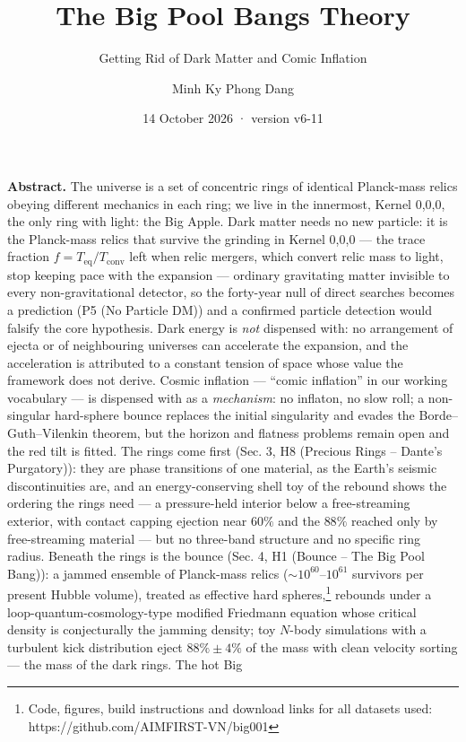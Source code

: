 \documentclass[
  11pt,
]{article}
\title{The Big Pool Bangs Theory}
\subtitle{Getting Rid of Dark Matter and Comic Inflation}
\author{Minh Ky Phong Dang}
\date{14 October 2026 · version v6-11}
\begin{document}
\maketitle

\textbf{Abstract.} The universe is a set of concentric rings of
identical Planck-mass relics obeying different mechanics in each ring;
we live in the innermost, Kernel 0,0,0, the only ring with light: the
Big Apple. Dark matter needs no new particle: it is the Planck-mass
relics that survive the grinding in Kernel 0,0,0 --- the trace fraction
\(f = T_{\text{eq}}/T_{\text{conv}}\) left when relic mergers, which
convert relic mass to light, stop keeping pace with the expansion ---
ordinary gravitating matter invisible to every non-gravitational
detector, so the forty-year null of direct searches becomes a prediction
(P5 (No Particle DM)) and a confirmed particle detection would falsify
the core hypothesis. Dark energy is \emph{not} dispensed with: no
arrangement of ejecta or of neighbouring universes can accelerate the
expansion, and the acceleration is attributed to a constant tension of
space whose value the framework does not derive. Cosmic inflation ---
``comic inflation'' in our working vocabulary --- is dispensed with as a
\emph{mechanism}: no inflaton, no slow roll; a non-singular hard-sphere
bounce replaces the initial singularity and evades the
Borde--Guth--Vilenkin theorem, but the horizon and flatness problems
remain open and the red tilt is fitted. The rings come first (Sec. 3, H8
(Precious Rings -- Dante's Purgatory)): they are phase transitions of
one material, as the Earth's seismic discontinuities are, and an
energy-conserving shell toy of the rebound shows the ordering the rings
need --- a pressure-held interior below a free-streaming exterior, with
contact capping ejection near \(60\%\) and the \(88\%\) reached only by
free-streaming material --- but no three-band structure and no specific
ring radius. Beneath the rings is the bounce (Sec. 4, H1 (Bounce -- The
Big Pool Bang)): a jammed ensemble of Planck-mass relics
(\(\sim\!10^{60}\)--\(10^{61}\) survivors per present Hubble volume),
treated as effective hard spheres,\footnote{Code, figures, build
  instructions and download links for all datasets used:
  https://github.com/AIMFIRST-VN/big001} rebounds under a
loop-quantum-cosmology-type modified Friedmann equation whose critical
density is conjecturally the jamming density; toy \(N\)-body simulations
with a turbulent kick distribution eject \(88\% \pm 4\%\) of the mass
with clean velocity sorting --- the mass of the dark rings. The hot Big
\end{document}
